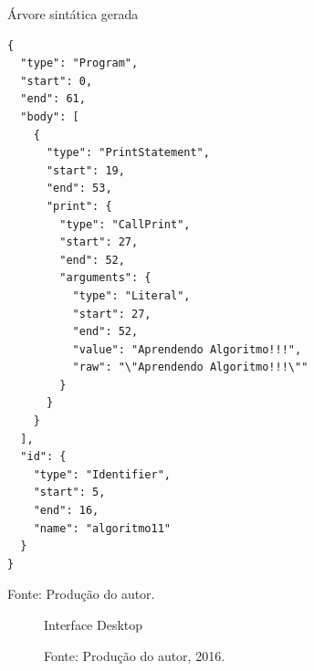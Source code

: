 \begin{quadro}[h]
\centering
  \caption{Árvore sintática gerada}\label{qua:sintaxtree}
\begin{lstlisting}[style=json,frame=single]
{
  "type": "Program",
  "start": 0,
  "end": 61,
  "body": [
    {
      "type": "PrintStatement",
      "start": 19,
      "end": 53,
      "print": {
        "type": "CallPrint",
        "start": 27,
        "end": 52,
        "arguments": {
          "type": "Literal",
          "start": 27,
          "end": 52,
          "value": "Aprendendo Algoritmo!!!",
          "raw": "\"Aprendendo Algoritmo!!!\""
        }
      }
    }
  ],
  "id": {
    "type": "Identifier",
    "start": 5,
    "end": 16,
    "name": "algoritmo11"
  }
}
\end{lstlisting}
  \caption*{\footnotesize Fonte: Produção do autor.}
\end{quadro}

\begin{figure}[h]
  \caption{Interface Desktop}\label{fig:interfacedesktop}
  \centering
  \setlength{\fboxsep}{0pt}%
\setlength{\fboxrule}{1pt}%
  \caption*{\footnotesize Fonte: Produção do autor, 2016.}
\end{figure}

